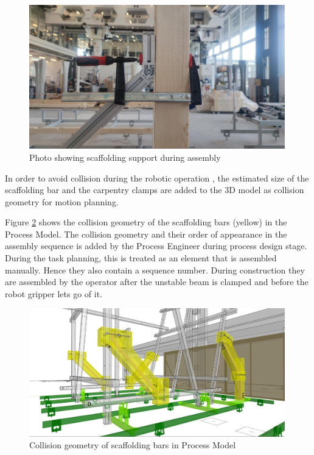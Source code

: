 \begin{figure}[!h]
    \centering
    \includegraphics[width=0.99\textwidth]{images/08/img10.jpg}
    \caption{Photo showing scaffolding support during assembly}
    \label{fig:photo-scaffolding-support}
\end{figure}



In order to avoid collision during the robotic operation , the estimated size of the scaffolding bar and the carpentry clamps are added to the 3D model as collision geometry for motion planning.

Figure \ref{fig:cm-scaffolding-bars} shows the collision geometry of the scaffolding bars (yellow) in the Process Model. The collision geometry and their order of appearance in the assembly sequence is added by the Process Engineer during process design stage. During the task planning, this is treated as an element that is assembled manually. Hence they also contain a sequence number. During construction they are assembled by the operator after the unstable beam is clamped and before the robot gripper lets go of it. 


\begin{figure}[!h]
    \centering
    \includegraphics[width=0.99\textwidth]{images/08/img11.jpg}
    \caption{Collision geometry of scaffolding bars in Process Model}
    \label{fig:cm-scaffolding-bars}
\end{figure}

